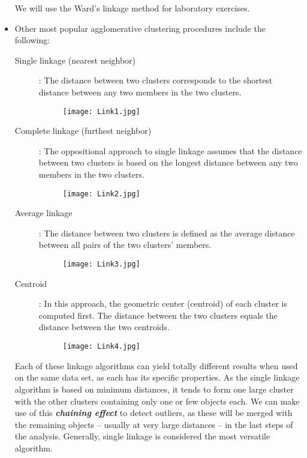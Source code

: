 \documentclass[a4paper,12pt]{article}
\begin{document}
\begin{itemize}
We will use the Ward's linkage method for laboratory exercises.

\item Other most popular
agglomerative clustering procedures include the following:
\begin{description}
\item[Single linkage (nearest neighbor)]: The distance between two clusters corresponds
to the shortest distance between any two members in the two clusters.
\begin{figure}[h!]
\begin{center}
  \texttt{[image: Link1.jpg]}\\
\end{center}
\end{figure}
\item[Complete linkage (furthest neighbor)]: The oppositional approach to single
linkage assumes that the distance between two clusters is based on the longest
distance between any two members in the two clusters.
\begin{figure}[h!]
\begin{center}
  \texttt{[image: Link2.jpg]}\\
\end{center}
\end{figure}
\item[Average linkage] : The distance between two clusters is defined as the average
distance between all pairs of the two clusters’ members.
\begin{figure}[h!]
\begin{center}
  \texttt{[image: Link3.jpg]}\\
\end{center}
\end{figure}
\newpage
\item[Centroid] : In this approach, the geometric center (centroid) of each cluster is
computed first. The distance between the two clusters equals the distance between
the two centroids.
\begin{figure}[h!]
\begin{center}
  \texttt{[image: Link4.jpg]}\\
\end{center}
\end{figure}
\end{description}
Each of these linkage algorithms can yield totally different results when used on the same data set, as each has its specific properties. As the single linkage algorithm is based on minimum distances, it tends to form one large cluster with the other clusters containing only one or few objects each. We can make use of this \textbf{\textit{chaining effect}} to detect outliers, as these will be merged with the remaining objects – usually at very large distances – in the last steps of the analysis. Generally, single linkage is considered the most versatile algorithm.


\end{itemize}
\end{document}
